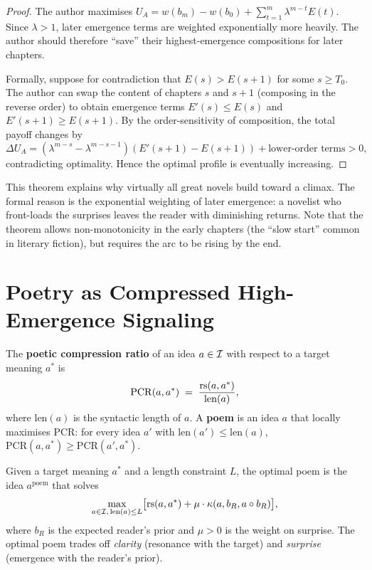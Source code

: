 \begin{proof}
The author maximises $U_A = w(b_m) - w(b_0) + \sum_{t=1}^m
\lambda^{m-t} E(t)$.  Since $\lambda > 1$, later emergence
terms are weighted exponentially more heavily.  The author
should therefore ``save'' their highest-emergence compositions
for later chapters.

Formally, suppose for contradiction that $E(s) > E(s+1)$ for
some $s \ge T_0$.  The author can swap the content of chapters
$s$ and $s+1$ (composing in the reverse order) to obtain
emergence terms $E'(s) \le E(s)$ and $E'(s+1) \ge E(s+1)$.
By the order-sensitivity of composition, the total payoff changes by
\[
  \Delta U_A = (\lambda^{m-s} - \lambda^{m-s-1})(E'(s+1) - E(s+1))
  + \text{lower-order terms} > 0,
\]
contradicting optimality.  Hence the optimal profile is
eventually increasing.
\end{proof}

\begin{interpretation}
This theorem explains why virtually all great novels build toward
a climax.  The formal reason is the exponential weighting of later
emergence: a novelist who front-loads the surprises leaves the
reader with diminishing returns.  Note that the theorem allows
non-monotonicity in the early chapters (the ``slow start''
common in literary fiction), but requires the arc to be rising
by the end.
\end{interpretation}

\section{Poetry as Compressed High-Emergence Signaling}
\label{sec:poetry-strategy}

\begin{definition}
\label{def:poetic-compression}
The \textbf{poetic compression ratio} of an idea $a \in \mathcal{I}$ with
respect to a target meaning $a^*$ is
\[
  \mathrm{PCR}(a, a^*) \;=\;
  \frac{\mathrm{rs}(a, a^*)}{\mathrm{len}(a)},
\]
where $\mathrm{len}(a)$ is the syntactic length of $a$.  A \textbf{poem}
is an idea $a$ that locally maximises PCR: for every idea $a'$ with
$\mathrm{len}(a') \le \mathrm{len}(a)$, $\mathrm{PCR}(a, a^*) \ge
\mathrm{PCR}(a', a^*)$.
\end{definition}

\begin{theorem}
\label{thm:poetry-optimisation}
Given a target meaning $a^*$ and a length constraint $L$, the
optimal poem is the idea $a^{\mathrm{poem}}$ that solves
\[
  \max_{a \in \mathcal{I},\, \mathrm{len}(a) \le L}
  \bigl[\mathrm{rs}(a, a^*) + \mu \cdot \kappa(a, b_R, a \circ b_R)\bigr],
\]
where $b_R$ is the expected reader's prior and $\mu > 0$ is the
weight on surprise.  The optimal poem trades off \emph{clarity}
(resonance with the target) and \emph{surprise} (emergence with
the reader's prior).
\end{theorem}

